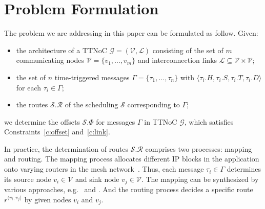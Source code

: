 \documentclass[10pt,journal]{IEEEtran}
\newcommand{\calG}{\mathcal{G}}
\newcommand{\calV}{\mathcal{V}}
\newcommand{\calL}{\mathcal{L}}
\newcommand{\calS}{\mathcal{S}}
\newcommand{\calR}{\mathcal{R}}
\newcommand{\route}[3]{#1^{\langle #2,#3\rangle}}
\theoremstyle{remark}
\begin{document}
\section{Problem Formulation\label{s:formulation}}
The problem we are addressing in this paper can be formulated as
follow. 
Given:
\begin{itemize}
\item the architecture of a TTNoC $\calG=(\calV,\calL)$ consisting of
  the set of $m$ communicating nodes $\calV=\{v_{1},\dots,v_{m}\}$ and
  interconnection links $\calL \subseteq \calV \times \calV$;
\item the set of $n$ time-triggered messages $\Gamma =
  \{\tau_{1},\dots,\tau_{n} \}$ with $\langle \tau_{i}.H,\tau_{i}.S,
  \tau_{i}.T, \tau_{i}.D\rangle$ for each $\tau_i \in \Gamma$;
\item the routes $\calS.\calR$ of the scheduling $\calS$ corresponding
  to $\Gamma$;
\end{itemize}
we determine the offsets $\calS.\Phi$ for messages $\Gamma$ in TTNoC $\calG$,
 which satisfies Constraints~\ref{c:offset} and~\ref{c:link}.

In practice, the determination of routes $\calS.\calR$ comprises two processes: mapping and routing. 
The mapping process allocates different IP blocks in the application onto varying routers in the mesh network~\cite{DBLP:journals/tjs/WangLY16}.
Thus, each message $\tau_i\in\Gamma$ determines its source node $v_i\in\calV$ and sink node $v_j\in\calV$. 
The mapping can be synthesized by various approaches, e.g.~\cite{DBLP:conf/recosoc/MesidisI11} and \cite{DBLP:journals/ieiceee/WangLYS16}.  
And the routing process decides a specific route $\route{r}{v_i}{v_j}$ by given nodes $v_i$ and $v_j$.

\end{document}
